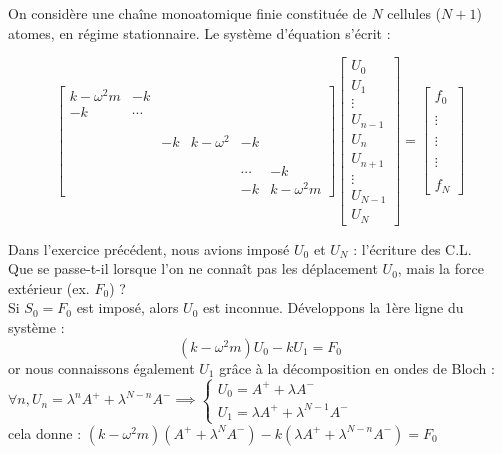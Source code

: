 \documentclass[12pt,a4paper]{article}
\begin{document}
	On considère une chaîne monoatomique finie constituée de $N$ cellules ($N+1$) atomes, en régime stationnaire. Le système d'équation s'écrit :
	
	\[
	\begin{bmatrix}
		k-\omega^2 m & -k \\
		-k & \cdots \\\\\\
		& &  - k & k-\omega^2 & -k \\\\\\
		& & & & \cdots & -k \\
		& & & & -k & k-\omega^2 m
	\end{bmatrix}\begin{bmatrix}
	U_0 \\  U_1 \\ \vdots \\ U_{n-1}\\U_n \\ U_{n+1} \\\vdots\\U_{N-1}\\U_N
	\end{bmatrix} = \begin{bmatrix}
	f_0 \\ \\ 
	\vdots\\ \\
	\vdots\\ \\
	\vdots\\ \\
	f_N
	\end{bmatrix}
	\]
	
	Dans l'exercice précédent, nous avions imposé $U_0$ et $U_N$ : l'écriture des C.L.\\
	Que se passe-t-il lorsque l'on ne connaît pas les déplacement $U_0$, mais la force extérieur (ex. $F_0$) ?\\
	
	Si \underline{$S_0 =F_0$} est imposé, alors $U_0$ est inconnue. Développons la 1ère ligne du système :
	\[
	(k-\omega^2 m)U_0-kU_1 = F_0
	\] 
	or nous connaissons également $U_1$ grâce à la décomposition en ondes de Bloch : $\forall n, U_n = \lambda^n A^+ + \lambda^{N-n}A^- \implies\begin{cases}
		U_0 = A^+ + \lambda A^- \\
		U_1 = \lambda A^+ +\lambda^{N-1}A^-
	\end{cases}$\\
	cela donne : $(k-\omega^2 m)(A^+ + \lambda^N A^-) - k(\lambda A^+ + \lambda^{N-n}A^-) = F_0$\\
	
\end{document}
